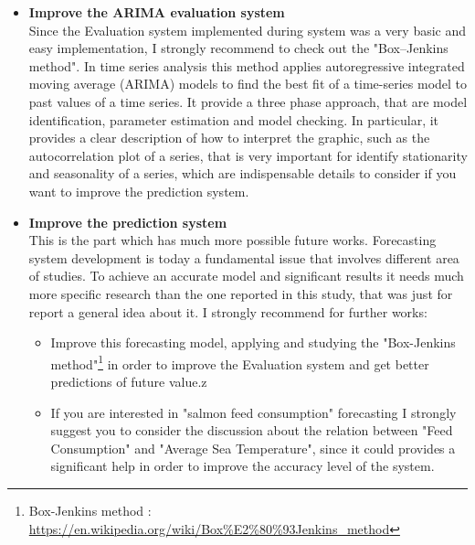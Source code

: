 \begin{itemize}
\newpage

\item \textbf{Improve the ARIMA evaluation system}\\ Since the Evaluation system implemented during system was a very basic and easy implementation, I strongly recommend to check out the "Box–Jenkins method"\cite{wiki:BoxJenkinsMethod}. In time series analysis this method applies autoregressive integrated moving average (ARIMA) models to find the best fit of a time-series model to past values of a time series. It provide a three phase approach, that are model identification, parameter estimation and model checking. In particular, it provides a clear description of how to interpret the graphic, such as the autocorrelation plot of a series, that is very important for identify stationarity and seasonality of a series, which are indispensable details to consider if you want to improve the prediction system.

\item \textbf{Improve the prediction system}\\ This is the part which has much more possible future works. Forecasting system development is today a fundamental issue that involves different area of studies. To achieve an accurate model and significant results it needs much more specific research than the one reported in this study, that was just for report a general idea about it. I strongly recommend for further works:
\begin{itemize}
\item Improve this forecasting model, applying and studying the "Box-Jenkins method"\footnote{Box-Jenkins method : \url{https://en.wikipedia.org/wiki/Box\%E2\%80\%93Jenkins\_method}} in order to improve the Evaluation system and get better predictions of future value.z
\item If you are interested in "salmon feed consumption" forecasting I strongly suggest you to consider the discussion about the relation between "Feed Consumption" and "Average Sea Temperature", since it could provides a significant help in order to improve the accuracy level of the system.
\end{itemize}
\end{itemize}




